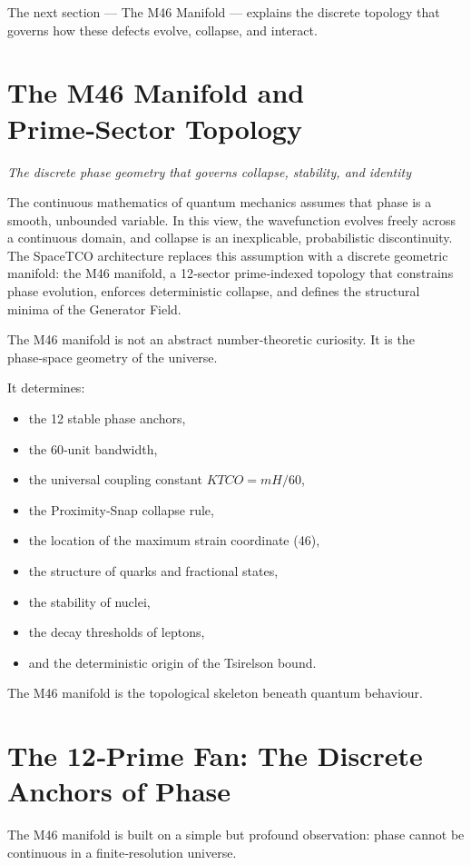 \documentclass[reprint,amsmath,amssymb,aps,prl,floatfix]{revtex4-2}
\begin{document}
\begin{itemize}
The next section — The M46 Manifold — explains the discrete topology that governs how these defects evolve, collapse, and interact.

\section{The M46 Manifold and Prime‑Sector Topology}
\textit{The discrete phase geometry that governs collapse, stability, and identity}

The continuous mathematics of quantum mechanics assumes that phase is a smooth, unbounded variable. In this view, the wavefunction evolves freely across a continuous domain, and collapse is an inexplicable, probabilistic discontinuity. The SpaceTCO architecture replaces this assumption with a discrete geometric manifold: the M46 manifold, a 12‑sector prime‑indexed topology that constrains phase evolution, enforces deterministic collapse, and defines the structural minima of the Generator Field.
\medskip

The M46 manifold is not an abstract number‑theoretic curiosity.  
It is the phase‑space geometry of the universe.
\medskip

It determines:
\begin{itemize}
\item the 12 stable phase anchors,  
\item the 60‑unit bandwidth,  
\item the universal coupling constant \(K{TCO} = mH / 60\),  
\item the Proximity‑Snap collapse rule,  
\item the location of the maximum strain coordinate (46),  
\item the structure of quarks and fractional states,  
\item the stability of nuclei,  
\item the decay thresholds of leptons,  
\item and the deterministic origin of the Tsirelson bound.
\end{itemize}
\medskip

The M46 manifold is the topological skeleton beneath quantum behaviour.

\section{The 12‑Prime Fan: The Discrete Anchors of Phase}

The M46 manifold is built on a simple but profound observation:  
phase cannot be continuous in a finite‑resolution universe.
\medskip


\end{itemize}
\end{document}
